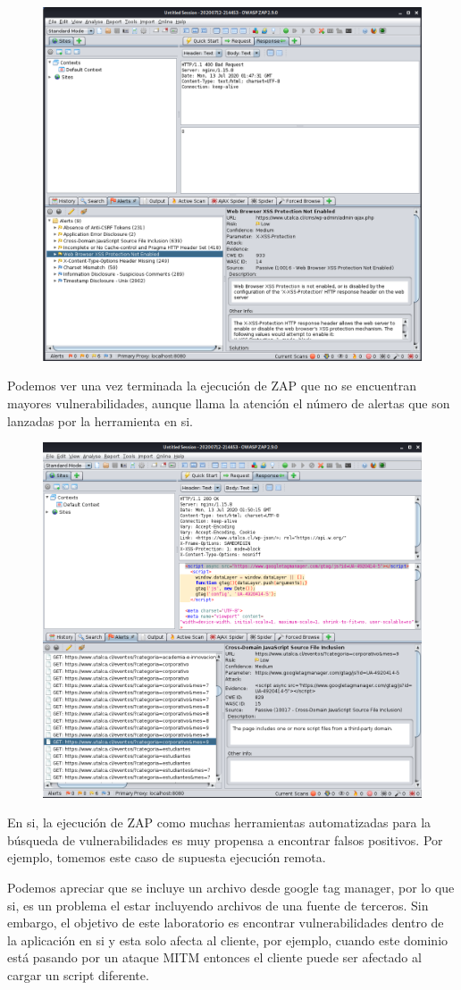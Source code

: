 \documentclass[11pt]{utalcaDoc}
\begin{document}
\begin{figure}[H]
	\centering
	\includegraphics[width=.75\textwidth]{images2/zap2.png}
\end{figure}
Podemos ver una vez terminada la ejecución de ZAP que no se encuentran mayores vulnerabilidades, aunque llama la atención el número de alertas que son lanzadas por la herramienta en si.
\begin{figure}[H]
	\centering
	\includegraphics[width=.75\textwidth]{images2/zap4.png}
\end{figure}
En si, la ejecución de ZAP como muchas herramientas automatizadas para la búsqueda de vulnerabilidades es muy propensa a encontrar falsos positivos. Por ejemplo, tomemos este caso de supuesta ejecución remota.

Podemos apreciar que se incluye un archivo desde google tag manager, por lo que si, es un problema el estar incluyendo archivos de una fuente de terceros. Sin embargo, el objetivo de este laboratorio es encontrar vulnerabilidades dentro de la aplicación en si y esta solo afecta al cliente, por ejemplo, cuando este dominio está pasando por un ataque MITM entonces el cliente puede ser afectado al cargar un script diferente. 
\end{document}
